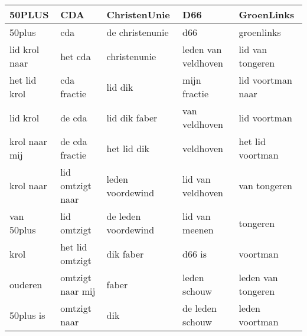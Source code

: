 \begin{tabular}{lllll}
\toprule
        50PLUS &               CDA &         ChristenUnie &                  D66 &          GroenLinks \\
\midrule
        50plus &               cda &      de christenunie &                  d66 &          groenlinks \\
 lid krol naar &           het cda &         christenunie &  leden van veldhoven &    lid van tongeren \\
  het lid krol &       cda fractie &              lid dik &         mijn fractie &   lid voortman naar \\
      lid krol &            de cda &        lid dik faber &        van veldhoven &        lid voortman \\
 krol naar mij &    de cda fractie &          het lid dik &            veldhoven &    het lid voortman \\
     krol naar &  lid omtzigt naar &     leden voordewind &    lid van veldhoven &        van tongeren \\
    van 50plus &       lid omtzigt &  de leden voordewind &       lid van meenen &            tongeren \\
          krol &   het lid omtzigt &            dik faber &               d66 is &            voortman \\
       ouderen &  omtzigt naar mij &                faber &         leden schouw &  leden van tongeren \\
     50plus is &      omtzigt naar &                  dik &      de leden schouw &      leden voortman \\
\bottomrule
\end{tabular}
